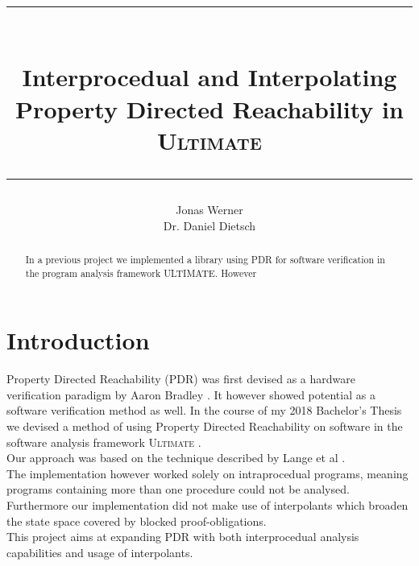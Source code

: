 \documentclass{article}
\newcommand\mycom[1]{}
\newcommand\mycom[1]{#1}
\newcommand{\jw}[1]{\mycom{\todo[color=blue!40,inline]{\small JW: #1}}}
\begin{document}
	\newcommand{\HorizontalLine}{\rule{\linewidth}{0.3mm}}
	
	\title{ \HorizontalLine \\ \textbf{Interprocedual and Interpolating \\ Property Directed Reachability in \textsc{Ultimate}} \HorizontalLine}
	

	
	\author{Jonas Werner \\ Dr. Daniel Dietsch}


	
	\date{} 
	
	\maketitle
	
	\begin{abstract}
	In a previous project we implemented a library using PDR for software verification in the program analysis framework ULTIMATE. However \jw{...}
	\end{abstract}
	
	
	\section{Introduction}
	
	Property Directed Reachability (PDR) was first devised as a hardware verification paradigm by Aaron Bradley \cite{DBLP:conf/vmcai/Bradley11}. It however showed potential as a software verification method as well.
	In the course of my 2018 Bachelor's Thesis we devised a method of using Property Directed Reachability on software in the software analysis framework \textsc{Ultimate} \cite{Zitat02}. \\
	Our approach was based on the technique described by Lange et al \cite{DBLP:conf/date/WelpK13}. \\ The implementation however worked solely on intraprocedual programs, meaning programs containing more than one procedure could not be analysed. \\
	Furthermore our implementation did not make use of interpolants which broaden the state space covered by blocked proof-obligations. \\
	This project aims at expanding PDR with both interprocedual analysis capabilities and usage of interpolants. \par
	
\end{document}
